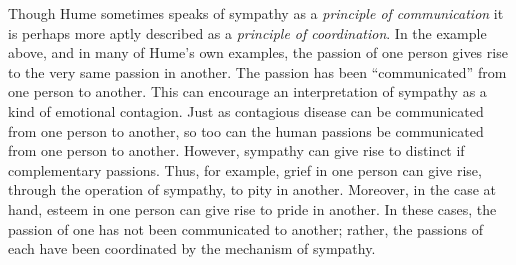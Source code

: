 % 


Though Hume sometimes speaks of sympathy as a \emph{principle of communication} it is perhaps more aptly described as a \emph{principle of coordination}. In the example above, and in many of Hume's own examples, the passion of one person gives rise to the very same passion in another. The passion has been ``communicated'' from one person to another. This can encourage an interpretation of sympathy as a kind of emotional contagion. Just as contagious disease can be communicated from one person to another, so too can the human passions be communicated from one person to another. However, sympathy can give rise to distinct if complementary passions. Thus, for example, grief in one person can give rise, through the operation of sympathy, to pity in another. Moreover, in the case at hand, esteem in one person can give rise to pride in another. In these cases, the passion of one has not been communicated to another; rather, the passions of each have been coordinated by the mechanism of sympathy.

